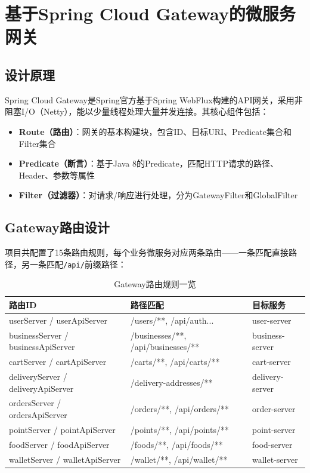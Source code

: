 
\chapter{基于Spring Cloud Gateway的微服务网关}

\section{设计原理}

Spring Cloud Gateway是Spring官方基于Spring WebFlux构建的API网关，采用非阻塞I/O（Netty），能以少量线程处理大量并发连接。其核心组件包括：

\begin{itemize}
	\item \textbf{Route（路由）}：网关的基本构建块，包含ID、目标URI、Predicate集合和Filter集合
	\item \textbf{Predicate（断言）}：基于Java 8的Predicate，匹配HTTP请求的路径、Header、参数等属性
	\item \textbf{Filter（过滤器）}：对请求/响应进行处理，分为GatewayFilter和GlobalFilter
\end{itemize}

\section{Gateway路由设计}

项目共配置了15条路由规则，每个业务微服务对应两条路由——一条匹配直接路径，另一条匹配\verb|/api/|前缀路径：

\begin{table}[H]
	\centering
	\caption{Gateway路由规则一览}
	\begin{tabular}{p{4.0cm}p{4.5cm}p{4.0cm}}
		\hline
		\textbf{路由ID} & \textbf{路径匹配} & \textbf{目标服务} \\
		\hline
		userServer / userApiServer & /users/**, /api/auth... & user-server \\
		businessServer / businessApiServer & /businesses/**, /api/businesses/** & business-server \\
		cartServer / cartApiServer & /carts/**, /api/carts/** & cart-server \\
		deliveryServer / deliveryApiServer & /delivery-addresses/** & delivery-server \\
		ordersServer / ordersApiServer & /orders/**, /api/orders/** & order-server \\
		pointServer / pointApiServer & /points/**, /api/points/** & point-server \\
		foodServer / foodApiServer & /foods/**, /api/foods/** & food-server \\
		walletServer / walletApiServer & /wallet/**, /api/wallet/** & wallet-server \\
		\hline
	\end{tabular}
\end{table}

